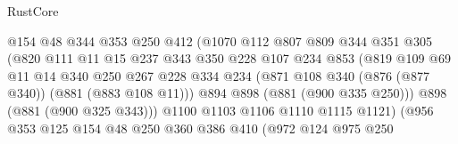 \begin{lexlean}{RustCore}
\begin{coremodule}
                                  @154
                                  @48
                                  @344
                                  @353
                                  @250
                                  @412
                                  (@1070
                                    @112
                                    @807
                                    @809
                                    @344
                                    @351
                                    @305
                                    (@820
                                      @111
                                      @11
                                      @15
                                      @237
                                      @343
                                      @350
                                      @228
                                      @107
                                      @234
                                      @853
                                      (@819
                                        @109
                                        @69
                                        @11
                                        @14
                                        @340
                                        @250
                                        @267
                                        @228
                                        @334
                                        @234
                                        (@871 @108 @340 (@876 (@877 @340)) (@881 (@883 @108 @11)))
                                        @894
                                        @898
                                        (@881 (@900 @335 @250)))
                                      @898
                                      (@881 (@900 @325 @343)))
                                    @1100
                                    @1103
                                    @1106
                                    @1110
                                    @1115
                                    @1121)
                                  (@956
                                    @353
                                    @125
                                    @154
                                    @48
                                    @250
                                    @360
                                    @386
                                    @410
                                    (@972
                                      @124
                                      @975
                                      @250

\end{coremodule}
\end{lexlean}
